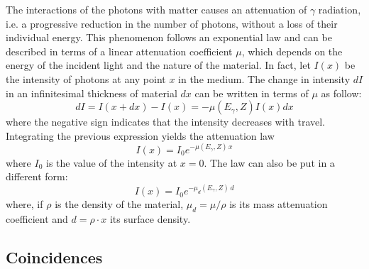 The interactions of the photons with matter causes an attenuation of $\gamma$ radiation, i.e. a progressive reduction in the number of photons, without a loss of their individual energy.
This phenomenon follows an exponential law and can be described in terms of a linear attenuation coefficient $\mu$, which depends on the energy of the incident light and the nature of the material.
In fact, let $I(x)$ be the intensity of photons at any point $x$ in the medium.
The change in intensity $dI$ in an infinitesimal thickness of material $dx$ can be written in terms of $\mu$ as follow:
\begin{equation}
    dI = I(x + dx) - I(x) = -\mu(E_{\gamma}, Z) I(x) dx
\end{equation}
where the negative sign indicates that the intensity decreases with travel.
Integrating the previous expression yields the attenuation law
\begin{equation} \label{eq:attenuation_law}
    I(x) = I_0 e^{-\mu(E_{\gamma}, Z) \, x}
\end{equation}
where $I_0$ is the value of the intensity at $x=0$. 
The law can also be put in a different form:
\begin{equation} \label{eq:attenuation_law_density}
    I(x) = I_0 e^{-\mu_d(E_{\gamma}, Z) \, d}
\end{equation}
where, if $\rho$ is the density of the material, $\mu_d = \mu / \rho$ is its mass attenuation coefficient and $d = \rho \cdot x$ its surface density.

\subsection{Coincidences}
\label{sec:coincidences}

